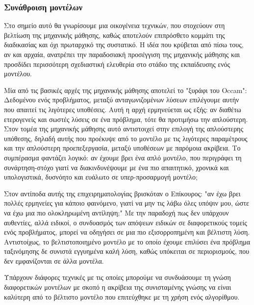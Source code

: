 \subsubsection{Συνάθροιση μοντέλων}
Στο σημείο αυτό θα γνωρίσουμε μια οικογένεια τεχνικών, που στοχεύουν στη βελτίωση της μηχανικής μάθησης, καθώς αποτελούν επιπρόσθετο κομμάτι της διαδικασίας και όχι πρωταρχικό της συστατικό. Η ιδέα που κρύβεται από πίσω τους, αν και αρχαία, ανατρέπει την παραδοσιακή προσέγγιση της μηχανικής μάθησης και προσδίδει περισσότερη σχεδιαστική ελευθερία στο στάδιο της εκπαίδευσης ενός μοντέλου.

Μία από τις βασικές αρχές της μηχανικής μάθησης αποτελεί το "ξυράφι του Occam": Δεδομένου ενός προβλήματος, μεταξύ ανταγωνιζομένων λύσεων επιλέγουμε αυτήν που απαιτεί τις λιγότερες υποθέσεις. Αυτή η αρχή ερμηνεύεται ως εξής: αν διαθέτω ετερογενείς και σωστές λύσεις σε ένα πρόβλημα, τότε θα προτιμήσω την απλούστερη. Στον τομέα της μηχανικής μάθησης αυτό αντιστοιχεί στην επιλογή της απλούστερης υπόθεσης, δηλαδή αυτής που προέκυψε από το μοντέλο με τις λιγότερες
παραμέτρους και την απλούστερη προεπεξεργασία, μεταξύ υποθέσεων με παρόμοια ακρίβεια. Το συμπέρασμα φαντάζει λογικό: αν έχουμε βρει ένα απλό μοντέλο, που περιγράφει τη συνάρτηση-στόχο γιατί να διακινδυνέψουμε με ένα πιο απαιτητικό, χρονικά και υπολογιστικά, δυσνόητο και ευάλωτο σε υπερ-προσαρμογή μοντέλο;

Στον αντίποδα αυτής της επιχειρηματολογίας βρισκόταν ο Επίκουρος: "αν έχω βρει πολλές ερμηνείες για κάποιο φαινόμενο, γιατί να μην τις λάβω όλες υπόψιν μου, ώστε να έχω μια πιο ολοκληρωμένη αντίληψη;" Με την παραδοχή πως δεν υπάρχουν αυθεντίες, αλλά ειδικοί, ο συνδυασμός των απόψεων ειδικών σε διαφορετικούς τομείς ενός προβλήματος, μπορεί να οδηγήσει σε μια πιο εξισορροπημένη και βέλτιστη λύση. Αντιστοίχως, το βελτιστοποιημένο μοντέλο με το οποίο έχουμε επιλύσει ένα πρόβλημα ταξινόμησης δε συνιστά εγγυημένα καλή λύση, καθώς υπόκειται σε περιορισμούς, που δεν εμφανίζονται σε άλλα μοντέλα.

Υπάρχουν διάφορες τεχνικές με τις οποίες μπορούμε να συνδυάσουμε τη γνώση διαφορετικών μοντέλων με σκοπό η ακρίβεια της συνισταμένης γνώσης να είναι καλύτερη από το βέλτιστο μοντέλο που επιτεύχθηκε με τη χρήση ενός αλγορίθμου.

